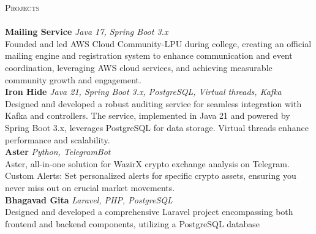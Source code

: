 \documentclass[a4paper]{article}
\newcommand{\lineunder} {
    \vspace*{-8pt} \\
    \hspace*{-18pt} \hrulefill \\
}
\newcommand{\header} [1] {
    {\hspace*{-18pt}\vspace*{6pt} \textsc{#1}}
    \vspace*{-6pt} \lineunder
}
\begin{document}
\header{Projects}
{\textbf{Mailing Service}} {\sl Java 17, Spring Boot 3.x} \hfill \href{https://github.com/AWS-Cloud-Community-LPU/mailing-service}{\faGithub}\\
Founded and led AWS Cloud Community-LPU during college, creating an official mailing engine and registration system to enhance communication and event coordination, leveraging AWS cloud services, and achieving measurable community growth and engagement.\\
\vspace*{2mm}
{\textbf{Iron Hide}} {\sl Java 21, Spring Boot 3.x, PostgreSQL, Virtual threads, Kafka} \hfill \href{https://github.com/garvit-joshi/ironhide}{\faGithub}\\
Designed and developed a robust auditing service for seamless integration with Kafka and controllers. The service, implemented in Java 21 and powered by Spring Boot 3.x, leverages PostgreSQL for data storage. Virtual threads enhance performance and scalability.\\
\vspace*{2mm}
{\textbf{Aster}} {\sl Python, TelegramBot} \hfill \href{https://github.com/garvit-joshi/Aster_TelegramBot}{\faGithub}\\
Aster, all-in-one solution for WazirX crypto exchange analysis on Telegram.\\
Custom Alerts: Set personalized alerts for specific crypto assets, ensuring you never miss out on crucial market movements.\\
\vspace*{2mm}
{\textbf{Bhagavad Gita}} {\sl Laravel, PHP, PostgreSQL} \hfill \href{https://github.com/garvit-joshi/Bhagavad-Gita}{\faGithub}\\
Designed and developed a comprehensive Laravel project encompassing both frontend and backend components, utilizing a PostgreSQL database\\
\vspace*{2mm}
\ 
\end{document}
